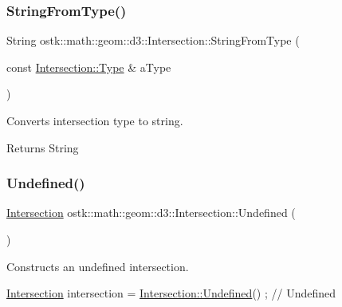 \subsubsection{\texorpdfstring{String\+From\+Type()}{StringFromType()}}
{\footnotesize\ttfamily String ostk\+::math\+::geom\+::d3\+::\+Intersection\+::\+String\+From\+Type (\begin{DoxyParamCaption}\item[{const \hyperlink{classostk_1_1math_1_1geom_1_1d3_1_1_intersection_a21196aae3f56795cb11d07afaaaf41c1}{Intersection\+::\+Type} \&}]{a\+Type }\end{DoxyParamCaption})\hspace{0.3cm}{\ttfamily [static]}}



Converts intersection type to string. 

\begin{DoxyReturn}{Returns}
String 
\end{DoxyReturn}
\mbox{\label{classostk_1_1math_1_1geom_1_1d3_1_1_intersection_a86f151eb732a797418cfa2f17dcee793}} 
\subsubsection{\texorpdfstring{Undefined()}{Undefined()}}
{\footnotesize\ttfamily \hyperlink{classostk_1_1math_1_1geom_1_1d3_1_1_intersection}{Intersection} ostk\+::math\+::geom\+::d3\+::\+Intersection\+::\+Undefined (\begin{DoxyParamCaption}{ }\end{DoxyParamCaption})\hspace{0.3cm}{\ttfamily [static]}}



Constructs an undefined intersection. 


\begin{DoxyCode}
\hyperlink{classostk_1_1math_1_1geom_1_1d3_1_1_intersection_a6091ab689809d0da1e670ca18dffb2d8}{Intersection} intersection = \hyperlink{classostk_1_1math_1_1geom_1_1d3_1_1_intersection_a86f151eb732a797418cfa2f17dcee793}{Intersection::Undefined}() ; \textcolor{comment}{// Undefined}
\end{DoxyCode}



